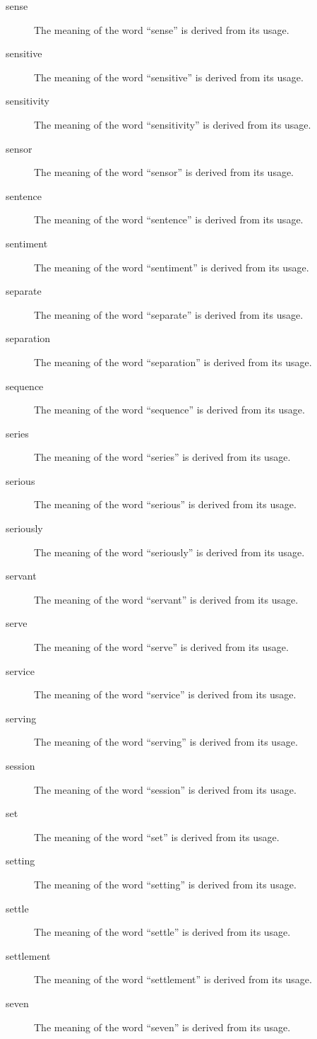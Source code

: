 \documentclass[12pt, letterpaper]{memoir}
\begin{document}
\begin{description}
\item[sense] The meaning of the word ``sense'' is derived from its usage.
\item[sensitive] The meaning of the word ``sensitive'' is derived from its usage.
\item[sensitivity] The meaning of the word ``sensitivity'' is derived from its usage.
\item[sensor] The meaning of the word ``sensor'' is derived from its usage.
\item[sentence] The meaning of the word ``sentence'' is derived from its usage.
\item[sentiment] The meaning of the word ``sentiment'' is derived from its usage.
\item[separate] The meaning of the word ``separate'' is derived from its usage.
\item[separation] The meaning of the word ``separation'' is derived from its usage.
\item[sequence] The meaning of the word ``sequence'' is derived from its usage.
\item[series] The meaning of the word ``series'' is derived from its usage.
\item[serious] The meaning of the word ``serious'' is derived from its usage.
\item[seriously] The meaning of the word ``seriously'' is derived from its usage.
\item[servant] The meaning of the word ``servant'' is derived from its usage.
\item[serve] The meaning of the word ``serve'' is derived from its usage.
\item[service] The meaning of the word ``service'' is derived from its usage.
\item[serving] The meaning of the word ``serving'' is derived from its usage.
\item[session] The meaning of the word ``session'' is derived from its usage.
\item[set] The meaning of the word ``set'' is derived from its usage.
\item[setting] The meaning of the word ``setting'' is derived from its usage.
\item[settle] The meaning of the word ``settle'' is derived from its usage.
\item[settlement] The meaning of the word ``settlement'' is derived from its usage.
\item[seven] The meaning of the word ``seven'' is derived from its usage.

\end{description}
\end{document}
